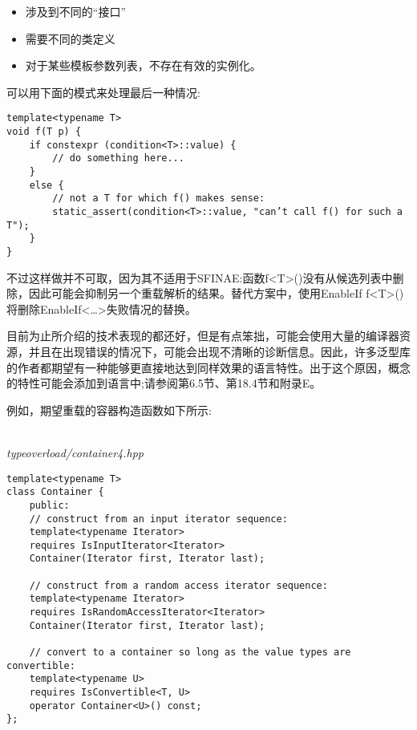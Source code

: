 \begin{itemize}
\item
涉及到不同的“接口”

\item
需要不同的类定义

\item
对于某些模板参数列表，不存在有效的实例化。
\end{itemize}

可以用下面的模式来处理最后一种情况:

\begin{lstlisting}[style=styleCXX]
template<typename T>
void f(T p) {
	if constexpr (condition<T>::value) {
		// do something here...
	}
	else {
		// not a T for which f() makes sense:
		static_assert(condition<T>::value, "can’t call f() for such a T");
	}
}
\end{lstlisting}

不过这样做并不可取，因为其不适用于SFINAE:函数f<T>()没有从候选列表中删除，因此可能会抑制另一个重载解析的结果。替代方案中，使用EnableIf f<T>()将删除EnableIf<…>失败情况的替换。


目前为止所介绍的技术表现的都还好，但是有点笨拙，可能会使用大量的编译器资源，并且在出现错误的情况下，可能会出现不清晰的诊断信息。因此，许多泛型库的作者都期望有一种能够更直接地达到同样效果的语言特性。出于这个原因，概念的特性可能会添加到语言中;请参阅第6.5节、第18.4节和附录E。

例如，期望重载的容器构造函数如下所示:

\hspace*{\fill} \\ %
\noindent
\textit{typeoverload/container4.hpp}
\begin{lstlisting}[style=styleCXX]
template<typename T>
class Container {
	public:
	// construct from an input iterator sequence:
	template<typename Iterator>
	requires IsInputIterator<Iterator>
	Container(Iterator first, Iterator last);
	
	// construct from a random access iterator sequence:
	template<typename Iterator>
	requires IsRandomAccessIterator<Iterator>
	Container(Iterator first, Iterator last);
	
	// convert to a container so long as the value types are convertible:
	template<typename U>
	requires IsConvertible<T, U>
	operator Container<U>() const;
};
\end{lstlisting}

